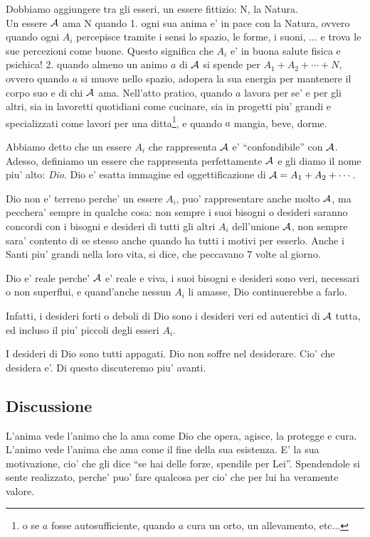 Dobbiamo aggiungere tra gli esseri, un essere fittizio: N, la Natura.\\

Un essere $\mathcal{A}$ ama N quando 1. ogni sua anima e' in pace con la Natura, ovvero quando ogni $A_i$ percepisce tramite i sensi lo spazio, le forme, i suoni, ... e trova le sue percezioni come buone. Questo significa che $A_i$ e' in buona salute fisica e psichica! 2. quando almeno un animo $a$ di $\mathcal{A}$ si spende per $A_1+A_2+\cdots+N$, ovvero quando $a$ si muove nello spazio, adopera la sua energia per mantenere il corpo suo e di chi $\mathcal{A}$ ama. Nell'atto pratico, quando $a$ lavora per se' e per gli altri, sia in lavoretti quotidiani come cucinare, sia in progetti piu' grandi e specializzati come lavori per una ditta\footnote{o se $a$ fosse autosufficiente, quando $a$ cura un orto, un allevamento, etc...}, e quando $a$ mangia, beve, dorme. \\

\def\Dio{D}

\begin{defn}
    Abbiamo detto che un essere $A_i$ che rappresenta $\mathcal{A}$ e' ``confondibile'' con $\mathcal{A}$. Adesso, definiamo un essere che rappresenta perfettamente $\mathcal{A}$ e gli diamo il nome piu' alto: \emph{Dio}. Dio e' esatta immagine ed oggettificazione di $\mathcal{A}=A_1+A_2+\cdots$.

    Dio non e' terreno perche' un essere $A_i$, puo' rappresentare anche molto $\mathcal{A}$, ma pecchera' sempre in qualche cosa: non sempre i suoi bisogni o desideri saranno concordi con i bisogni e desideri di tutti gli altri $A_i$ dell'unione $\mathcal{A}$, non sempre sara' contento di se stesso anche quando ha tutti i motivi per esserlo. Anche i Santi piu' grandi nella loro vita, si dice, che peccavano $7$ volte al giorno. 

    Dio e' reale perche' $\mathcal{A}$ e' reale e viva, i suoi bisogni e desideri sono veri, necessari o non superflui, e quand'anche nessun $A_i$ li amasse, Dio continuerebbe a farlo.

    Infatti, i desideri forti o deboli di Dio sono i desideri veri ed autentici di $\mathcal{A}$ tutta, ed incluso il piu' piccoli degli esseri $A_i$.

\end{defn}

    I desideri di Dio sono tutti appagati. Dio non soffre nel desiderare. Cio' che desidera e'. Di questo discuteremo piu' avanti.

\subsection{Discussione}
L'anima vede l'animo che la ama come Dio che opera, agisce, la protegge e cura. L'animo vede l'anima che ama come il fine della sua esistenza. E' la sua motivazione, cio' che gli dice ``se hai delle forze, spendile per Lei''. Spendendole si sente realizzato, perche' puo' fare qualcosa per cio' che per lui ha veramente valore.\\

